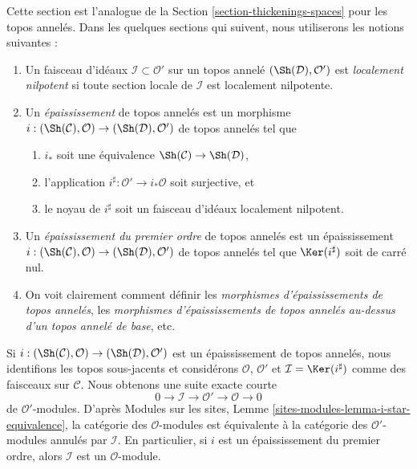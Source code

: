 \noindent
Cette section est l'analogue de la Section \ref{section-thickenings-spaces}
pour les topos annelés.
Dans les quelques sections qui suivent, nous utiliserons les notions suivantes :
\begin{enumerate}
\item Un faisceau d'idéaux $\mathcal{I} \subset \mathcal{O}'$ sur un topos
annelé $(\Sh(\mathcal{D}), \mathcal{O}')$ est {\it localement nilpotent} si
toute section locale de $\mathcal{I}$ est localement nilpotente.
\item Un {\it épaississement} de topos annelés est un morphisme
$i : (\Sh(\mathcal{C}), \mathcal{O}) \to (\Sh(\mathcal{D}), \mathcal{O}')$
de topos annelés tel que
\begin{enumerate}
\item $i_*$ soit une équivalence $\Sh(\mathcal{C}) \to \Sh(\mathcal{D})$,
\item l'application $i^\sharp : \mathcal{O}' \to i_*\mathcal{O}$ soit
surjective, et
\item le noyau de $i^\sharp$ soit un faisceau d'idéaux localement nilpotent.
\end{enumerate}
\item Un {\it épaississement du premier ordre} de topos annelés est un
épaississement
$i : (\Sh(\mathcal{C}), \mathcal{O}) \to (\Sh(\mathcal{D}), \mathcal{O}')$
de topos annelés tel que $\Ker(i^\sharp)$ soit de carré nul.
\item On voit clairement comment définir les
{\it morphismes d'épaississements de topos annelés}, les
{\it morphismes d'épaississements de topos annelés au-dessus d'un topos annelé
de base}, etc.
\end{enumerate}
Si
$i : (\Sh(\mathcal{C}), \mathcal{O}) \to (\Sh(\mathcal{D}), \mathcal{O}')$
est un épaississement de topos annelés, nous identifions les topos sous-jacents
et considérons $\mathcal{O}$, $\mathcal{O}'$ et
$\mathcal{I} = \Ker(i^\sharp)$ comme des faisceaux sur $\mathcal{C}$.
Nous obtenons une suite exacte courte
$$
0 \to \mathcal{I} \to \mathcal{O}' \to \mathcal{O} \to 0
$$
de $\mathcal{O}'$-modules. D'après Modules sur les sites,
Lemme \ref{sites-modules-lemma-i-star-equivalence}, la catégorie des
$\mathcal{O}$-modules est équivalente à la catégorie des
$\mathcal{O}'$-modules annulés par $\mathcal{I}$. En particulier, si $i$ est un
épaississement du premier ordre, alors $\mathcal{I}$ est un
$\mathcal{O}$-module.

